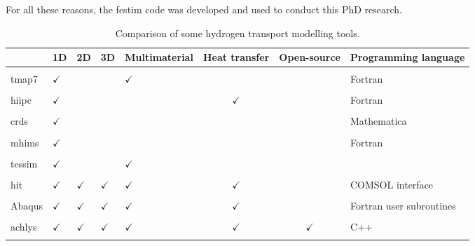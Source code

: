 For all these reasons, the \acrshort{festim} code was developed and used to conduct this PhD research.

\begin{table} [h]
    \centering
    \begin{tabular}{L{2cm} C{0.5cm} C{0.5cm} C{0.6cm} C{1.7cm} c c l }
        & 1D & 2D & 3D & Multimaterial & Heat transfer & Open-source & Programming language \\
        \hline \\
        \acrshort{tmap7} \cite{longhurst_tmap7_2008} & $\checkmark$ & & & $\checkmark$ & & & Fortran\\
        \\
        \acrshort{hiipc} \cite{sang_modelling_2012} & $\checkmark$ & & & & $\checkmark$ & & Fortran\\
        \\
        \acrshort{crds} \cite{matveev_reaction-diffusion_2018} & $\checkmark$ & & & & & & Mathematica \\
        \\
        \acrshort{mhims} \cite{hodille_study_2016} & $\checkmark$ & & & & & & Fortran \\
        \\
        \acrshort{tessim} \cite{schmid_transport_2014} & $\checkmark$ & & & $\checkmark$ & & & \\
        \\
        \acrshort{hit} \cite{candido_integrated_2020} & $\checkmark$ & $\checkmark$ & $\checkmark$ & $\checkmark$ & $\checkmark$ & & COMSOL interface\\
        \\
        Abaqus \cite{benannoune_multidimensional_2020} & $\checkmark$ & $\checkmark$ & $\checkmark$ & $\checkmark$ & $\checkmark$ & & Fortran user subroutines\\
        \\
        \gls{achlys} \cite{dixon_aurora-multiphysicsachlys_2021} & $\checkmark$ & $\checkmark$ & $\checkmark$ & $\checkmark$ & $\checkmark$ & $\checkmark$ & C++\\
        \\
    \end{tabular}
    \caption{Comparison of some hydrogen transport modelling tools.}
\end{table}

